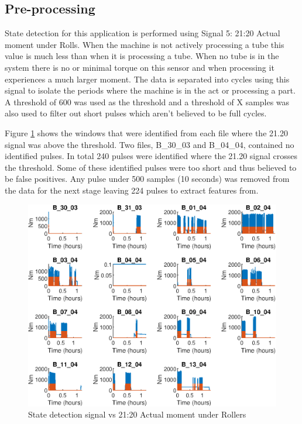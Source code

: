 \documentclass[]{article}
\begin{document}
\subsection{Pre-processing}
State detection for this application is performed using Signal 5: 21:20 Actual moment under Rolls. When the machine is not actively processing a tube this value is much less than when it is processing a tube. When no tube is in the system there is no or minimal torque on this sensor and when processing it experiences a much larger moment.
The data is separated into cycles using this signal to isolate the periods where the machine is in the act or processing a part. A threshold of 600 was used as the threshold and a threshold of X samples was also used to filter out short pulses which aren't believed to be full cycles.

Figure \ref{fig:StateDetection} shows the windows that were identified from each file where the 21.20 signal was above the threshold. Two files, B\_30\_03 and B\_04\_04, contained no identified pulses. In total 240 pulses were identified where the 21.20 signal crosses the threshold. Some of these identified pulses were too short and thus believed to be false positives. Any pulse under 500 samples (10 seconds) was removed from the data for the next stage leaving 224 pulses to extract features from.

\begin{figure}[H]
    \centering
    \includegraphics[width=\textwidth, height=\textheight, keepaspectratio]{figures/StateDetectionFig.eps}
    \caption{State detection signal vs 21:20 Actual moment under Rollers}
    \label{fig:StateDetection}
\end{figure}
\end{document}
